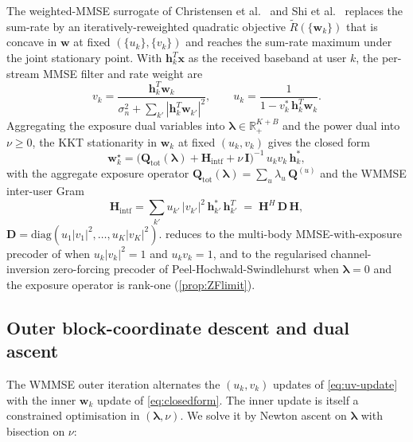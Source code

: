 \documentclass[journal,twocolumn,10pt]{IEEEtran}
\theoremstyle{plain}
\theoremstyle{remark}
\newcommand{\xx}{\mathbf{x}}
\newcommand{\hh}{\mathbf{h}}
\newcommand{\ww}{\mathbf{w}}
\newcommand{\Qmat}{\mathbf{Q}}
\newcommand{\Hintf}{\mathbf{H}_{\mathrm{intf}}}
\begin{document}
The weighted-MMSE surrogate of Christensen et
al.~\cite{Christensen2008} and Shi et al.~\cite{Shi2011} replaces
the sum-rate by an iteratively-reweighted quadratic objective
$\tilde R(\{\ww_k\})$ that is concave in $\ww$ at fixed
$(\{u_k\}, \{v_k\})$ and reaches the sum-rate maximum under the
joint stationary point. With $\hh_k^T \xx$ as the received baseband
at user $k$, the per-stream MMSE filter and rate weight are
\begin{equation}\label{eq:uv-update}
  v_k = \frac{\hh_k^T \ww_k}{\sigma_n^2 + \sum_{k'} |\hh_k^T \ww_{k'}|^2},
  \qquad
  u_k = \frac{1}{1 - v_k^*\,\hh_k^T \ww_k}.
\end{equation}
Aggregating the exposure dual variables into
$\bm\lambda \in \mathbb{R}_+^{K+B}$ and the power dual into
$\nu \geq 0$, the KKT stationarity in $\ww_k$ at fixed
$(u_k, v_k)$ gives the closed form
\begin{equation}\label{eq:closedform}
  \boxed{\;
  \ww_k^\star =
  \bigl(\Qmat_{\mathrm{tot}}(\bm\lambda)
  + \Hintf + \nu\,\mathbf{I}\bigr)^{-1}\,u_k v_k\,\hh_k^*,\;}
\end{equation}
with the aggregate exposure operator
$\Qmat_{\mathrm{tot}}(\bm\lambda) = \sum_{u} \lambda_u\,\Qmat^{(u)}$
and the WMMSE inter-user Gram
\begin{equation}\label{eq:Hgram}
  \Hintf = \sum_{k'} u_{k'}\,|v_{k'}|^2\,
  \hh_{k'}^*\,\hh_{k'}^T\;=\;\mathbf{H}^H\,\mathbf{D}\,\mathbf{H},
\end{equation}
$\mathbf{D} = \mathrm{diag}(u_1 |v_1|^2, \ldots, u_K |v_K|^2)$.
 reduces to the multi-body MMSE-with-exposure
precoder of \cite{Ying2017} when $u_k |v_k|^2 = 1$ and
$u_k v_k = 1$, and to the regularised channel-inversion
zero-forcing precoder of Peel-Hochwald-Swindlehurst
\cite{PeelHochwald2005} when $\bm\lambda = 0$ and the exposure
operator is rank-one (\cref{prop:ZFlimit}).

\subsection{Outer block-coordinate descent and dual ascent}\label{sec:wmmse-outer}

The WMMSE outer iteration alternates the $(u_k, v_k)$ updates of
\cref{eq:uv-update} with the inner $\ww_k$ update of
\cref{eq:closedform}. The inner update is itself a constrained
optimisation in $(\bm\lambda, \nu)$. We solve it by Newton ascent
on $\bm\lambda$ with bisection on $\nu$:
\end{document}
